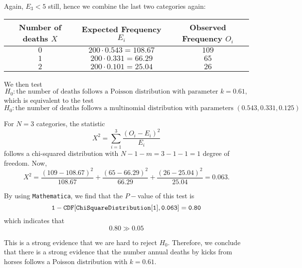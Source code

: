 \documentclass[13pt]{article}
\begin{document}
\par Again, $E_3<5$ still, hence we combine the last two categories again:
\begin{table}[H]
    \centering
    \begin{tabular}{ccc}
        Number of deaths $X$ & Expected Frequency $E_i$ & Observed Frequency $O_i$ \\
        \toprule
        $0$ & $200\cdot 0.543 = 108.67$ & $109$ \\
        $1$ & $200\cdot 0.331 = 66.29$ & $65$ \\
        $2$ & $200\cdot 0.101 = 25.04$ & $26$ \\
        \bottomrule
    \end{tabular}
\end{table}

\par We then test 
\begin{equation*}
    H_0 : \text{the number of deaths follows a Poisson distribution with parameter }k = 0.61,
\end{equation*}
which is equivalent to the test 
\begin{equation*}
    H_0 : \text{the number of deaths follows a multinomial distribution with parameters }(0.543, 0.331, 0.125)
\end{equation*}

\par For $N = 3$ categories, the statistic
\begin{equation*}
    X^2 = \sum^3_{i = 1}\frac{(O_i - E_i)^2}{E_i}
\end{equation*}
follows a chi-squared distribution with $N - 1 - m = 3 - 1 - 1 = 1$ degree of freedom. Now, 
\begin{equation*}
    X^2 = \frac{(109-108.67)^2}{108.67}+\frac{(65-66.29)^2}{66.29}+\frac{(26-25.04)^2}{25.04} = 0.063.
\end{equation*}

\par By using {\tt Mathematica}, we find that the $P-$value of this test is 
\begin{equation*}
    {\tt 1 - CDF[ChiSquareDistribution[1], 0.063] = 0.80}
\end{equation*}
which indicates that
\begin{equation*}
    0.80 \gg 0.05
\end{equation*}

\par This is a strong evidence that we are hard to reject $H_0$. Therefore, we conclude that there is a strong evidence that 
the number annual deaths by kicks from horses follows a Poisson distribution with $k = 0.61$.
\end{document}
